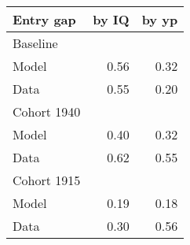 \begin{tabular}{lrr}
\hline
Entry gap & by IQ  & by yp  \\ 
\hline
Baseline &   &   \\ 
Model & 0.56  & 0.32  \\ 
Data & 0.55  & 0.20  \\ 
Cohort 1940 &   &   \\ 
Model & 0.40  & 0.32  \\ 
Data & 0.62  & 0.55  \\ 
Cohort 1915 &   &   \\ 
Model & 0.19  & 0.18  \\ 
Data & 0.30  & 0.56  \\ 
\hline
\end{tabular}%
